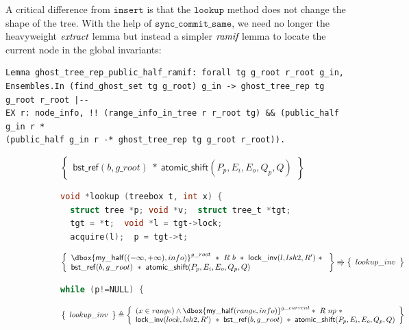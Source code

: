\documentclass[acmsmall,screen]{acmart}\settopmatter{printfolios=true}
\newcommand\dboxed[1]{\dbox{\ensuremath{#1}}}
\newcommand{\ghost}[2]{\ensuremath{\dboxed{#1}^{#2}}}
\newcommand{\nodeboxrep}{\ensuremath{\mathsf{bst\_ref}}}
\begin{document}
A critical difference from $\texttt{insert}$ is that the
$\texttt{lookup}$ method does not change the shape of the tree. With the
help of $\texttt{sync\_commit\_same}$, we need no longer the
heavyweight $\emph{extract}$ lemma but instead a simpler
$\emph{ramif}$ lemma to locate the current node in the global
invariants:
\begin{verbatim}
Lemma ghost_tree_rep_public_half_ramif: forall tg g_root r_root g_in,
Ensembles.In (find_ghost_set tg g_root) g_in -> ghost_tree_rep tg g_root r_root |-- 
EX r: node_info, !! (range_info_in_tree r r_root tg) && (public_half g_in r * 
(public_half g_in r -* ghost_tree_rep tg g_root r_root)).
\end{verbatim}

\begin{figure}[htp]
\begin{subfigure}[t]{1\textwidth}
 $$\left\{\begin{array}{l} \nodeboxrep(b,g\_root)\ *\ \mathsf{atomic\_shift}(P_p,E_i,E_o,Q_p,Q)\end{array}\right\}$$
\begin{lstlisting}[language = C,  numbers = none]
void *lookup (treebox t, int x) {
  struct tree *p; void *v;  struct tree_t *tgt;
  tgt = *t;  void *l = tgt->lock;
  acquire(l);  p = tgt->t;
 \end{lstlisting}  
 $$\left\{\begin{array}{l} \ghost{\mathsf{my\_half}((-\infty,+\infty),info)}{g\_root}\ *\ R\ b\ *\ \mathsf{lock\_inv}(l,lsh2,R')\ *\ \\
 \nodeboxrep(b,g\_root)\ *\ \mathsf{atomic\_shift}(P_p,E_i,E_o,Q_p,Q)\end{array}\right\} \Rrightarrow \left\{\begin{array}{l} lookup\_inv \end{array}\right\}$$ 
  \begin{lstlisting}[language = C, numbers = none]
    while (p!=NULL) {
       \end{lstlisting}   
   $$\left\{\begin{array}{l} lookup\_inv \end{array}\right\} \triangleq \left\{\begin{array}{l}(x\in range)\land \ghost{\mathsf{my\_half}(range,info)}{g\_current}*\ R\ np\ *\\\mathsf{lock\_inv}(lock,lsh2,R')\ *\ \nodeboxrep(b,g\_root)\ *\ \mathsf{atomic\_shift}(P_p,E_i,E_o,Q_p,Q)\end{array}\right\}$$
      \begin{lstlisting}[language = C,  numbers = none]

\end{lstlisting}
\end{subfigure}
\end{figure}
\end{document}
